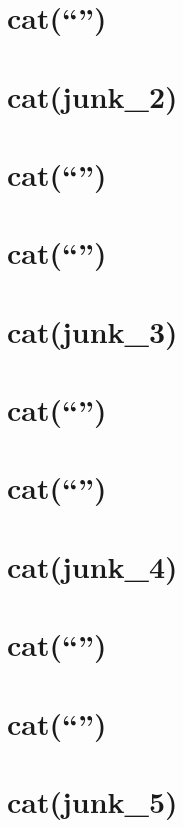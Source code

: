 \documentclass[]{article}
\begin{document}
\section{\texorpdfstring{cat(``\n'')}{cat()}}\label{cat-35}

\section{cat(junk\_2)}\label{catjunk_2}

\section{\texorpdfstring{cat(``\n'')}{cat()}}\label{cat-36}

\section{\texorpdfstring{cat(``\n'')}{cat()}}\label{cat-37}

\section{cat(junk\_3)}\label{catjunk_3}

\section{\texorpdfstring{cat(``\n'')}{cat()}}\label{cat-38}

\section{\texorpdfstring{cat(``\n'')}{cat()}}\label{cat-39}

\section{cat(junk\_4)}\label{catjunk_4}

\section{\texorpdfstring{cat(``\n'')}{cat()}}\label{cat-40}

\section{\texorpdfstring{cat(``\n'')}{cat()}}\label{cat-41}

\section{cat(junk\_5)}\label{catjunk_5}
\end{document}
